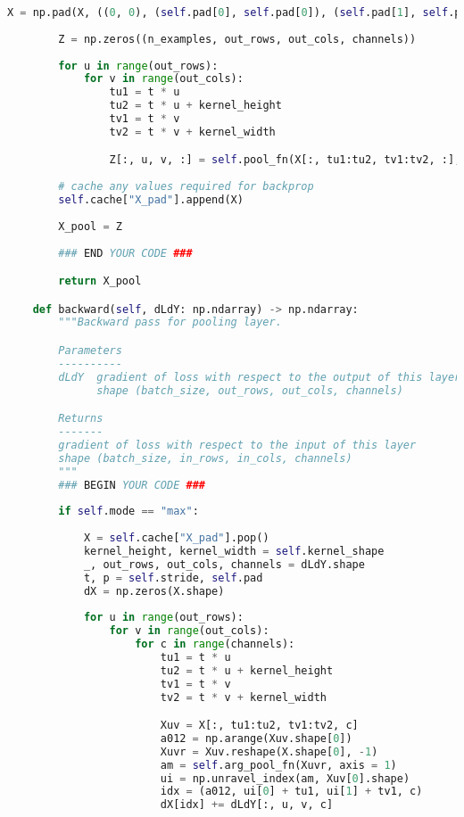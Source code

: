 \begin{lstlisting}[language=Python]
        X = np.pad(X, ((0, 0), (self.pad[0], self.pad[0]), (self.pad[1], self.pad[1]), (0, 0)))
        
        Z = np.zeros((n_examples, out_rows, out_cols, channels))
        
        for u in range(out_rows):
            for v in range(out_cols):
                tu1 = t * u
                tu2 = t * u + kernel_height
                tv1 = t * v
                tv2 = t * v + kernel_width

                Z[:, u, v, :] = self.pool_fn(X[:, tu1:tu2, tv1:tv2, :], axis = (1, 2))
        
        # cache any values required for backprop
        self.cache["X_pad"].append(X)        
        
        X_pool = Z
    
        ### END YOUR CODE ###

        return X_pool

    def backward(self, dLdY: np.ndarray) -> np.ndarray:
        """Backward pass for pooling layer.

        Parameters
        ----------
        dLdY  gradient of loss with respect to the output of this layer
              shape (batch_size, out_rows, out_cols, channels)

        Returns
        -------
        gradient of loss with respect to the input of this layer
        shape (batch_size, in_rows, in_cols, channels)
        """
        ### BEGIN YOUR CODE ###
        
        if self.mode == "max":
            
            X = self.cache["X_pad"].pop()
            kernel_height, kernel_width = self.kernel_shape
            _, out_rows, out_cols, channels = dLdY.shape
            t, p = self.stride, self.pad
            dX = np.zeros(X.shape)
            
            for u in range(out_rows):
                for v in range(out_cols):
                    for c in range(channels):
                        tu1 = t * u
                        tu2 = t * u + kernel_height
                        tv1 = t * v
                        tv2 = t * v + kernel_width

                        Xuv = X[:, tu1:tu2, tv1:tv2, c]
                        a012 = np.arange(Xuv.shape[0])
                        Xuvr = Xuv.reshape(X.shape[0], -1)
                        am = self.arg_pool_fn(Xuvr, axis = 1)
                        ui = np.unravel_index(am, Xuv[0].shape)
                        idx = (a012, ui[0] + tu1, ui[1] + tv1, c)
                        dX[idx] += dLdY[:, u, v, c]
        

\end{lstlisting}
